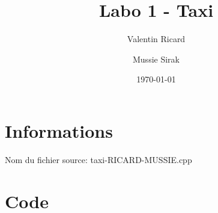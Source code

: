 \documentclass{article}
\title{Labo 1 - Taxi}
\author{Valentin Ricard}
\author{Mussie Sirak}
\affil[]{}
\date{\today}
\begin{document}
    \maketitle


    \section{Informations}\label{sec:informations}
    Nom du fichier source: {taxi-RICARD-MUSSIE.cpp}


    \section{Code}\label{sec:code}
    \inputminted[linenos, breaklines]{cpp}{repas.cpp}
\end{document}

